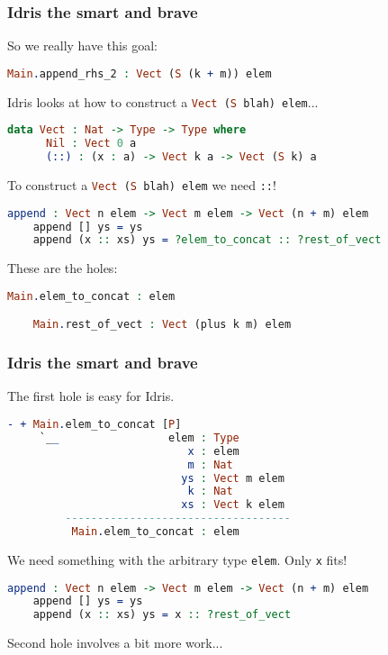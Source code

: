 \documentclass{beamer}
\begin{document}
\begin{frame}[fragile]
  \frametitle{Idris the smart and brave}

  So we really have this goal:

  \begin{lstlisting}[language=Idris]
    Main.append_rhs_2 : Vect (S (k + m)) elem
  \end{lstlisting}

  \pause

  Idris looks at how to construct a \lstinline[language=Idris,columns=fixed]{Vect (S blah) elem}...

  \pause

  \begin{lstlisting}[language=Idris]
    data Vect : Nat -> Type -> Type where
      Nil : Vect 0 a
      (::) : (x : a) -> Vect k a -> Vect (S k) a
  \end{lstlisting}

  \pause
  To construct a \lstinline[language=Idris,columns=fixed]{Vect (S blah) elem} we need \texttt{::}!

  \pause
  \begin{lstlisting}[language=Idris]
    append : Vect n elem -> Vect m elem -> Vect (n + m) elem
    append [] ys = ys
    append (x :: xs) ys = ?elem_to_concat :: ?rest_of_vect
  \end{lstlisting}

  \pause
  These are the holes:

  \begin{lstlisting}[language=Idris]
    Main.elem_to_concat : elem

    Main.rest_of_vect : Vect (plus k m) elem
  \end{lstlisting}
\end{frame}

\begin{frame}[fragile]
  \frametitle{Idris the smart and brave}  
  The first hole is easy for Idris.

  \begin{lstlisting}[language=Idris]
    - + Main.elem_to_concat [P]
     `__                 elem : Type
                            x : elem
                            m : Nat
                           ys : Vect m elem
                            k : Nat
                           xs : Vect k elem
         -----------------------------------
          Main.elem_to_concat : elem
  \end{lstlisting}

  \pause
  We need something with the arbitrary type \texttt{elem}. Only \texttt{x} fits!

  \pause

  \begin{lstlisting}[language=Idris]
    append : Vect n elem -> Vect m elem -> Vect (n + m) elem
    append [] ys = ys
    append (x :: xs) ys = x :: ?rest_of_vect
  \end{lstlisting}

  \pause

  Second hole involves a bit more work...
\end{frame}
\end{document}
